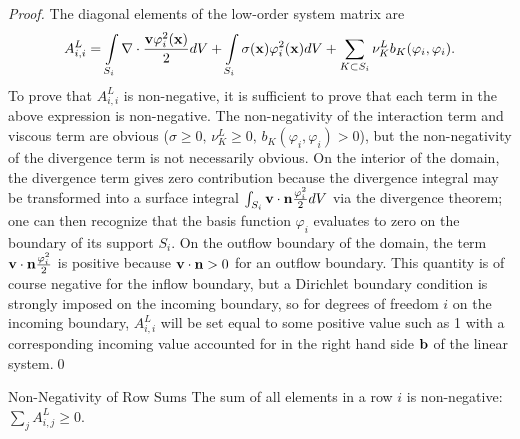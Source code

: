 \begin{proof}
The diagonal elements of the low-order system matrix are
\[
   A^L_{i,i} = \int\limits_{S_i}\nabla\cdot
   \frac{\mathbf{v}\varphi_i^2(\mathbf{x})}{2} dV
      + \int\limits_{S_i}\sigma(\mathbf{x})\varphi_i^2(\mathbf{x})dV
      + \sum\limits_{K\subset S_i}\nu_K^L b_K(\varphi_i, \varphi_i).
\]
To prove that $A^L_{i,i}$ is non-negative, it is sufficient to prove that
each term in the above expression is non-negative. The non-negativity of
the interaction term and viscous term are obvious ($\sigma \ge 0, 
\, \nu_K^L\ge 0, \, b_K(\varphi_i, \varphi_i)>0$), but
the non-negativity of the divergence term is not necessarily obvious. On the interior of
the domain, the divergence term gives zero contribution because the divergence integral may
be transformed into a surface integral $\int_{S_i}\mathbf{v}\cdot\mathbf{n}\frac{\varphi_i^2}{2} dV$
via the divergence theorem; one can then recognize that
the basis function $\varphi_i$ evaluates to zero on the boundary of its support $S_{i}$.
On the outflow boundary of the domain, the term $\mathbf{v}\cdot\mathbf{n}
\frac{\varphi_i^2}{2}$ is positive because $\mathbf{v}\cdot\mathbf{n} >0$
for an outflow boundary. This quantity is of course negative for the inflow boundary,
but a Dirichlet boundary condition is strongly imposed on the incoming boundary, so
for degrees of freedom $i$ on the incoming boundary, $A^L_{i,i}$ will be set equal
to some positive value such as 1 with a corresponding incoming value
accounted for in the right hand side $\mathbf{b}$ of the linear system.\qed
\end{proof}
\begin{lemma}{Non-Negativity of Row Sums}{}
   The sum of all elements in a row $i$ is non-negative: $\sum\limits_j A^L_{i,j} \ge 0$.
\end{lemma}

